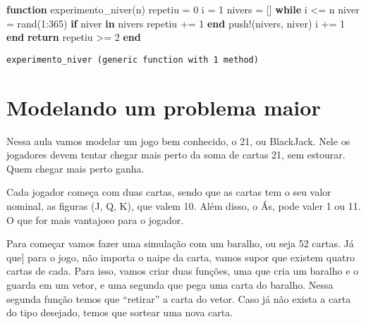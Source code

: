 \documentclass[
  letterpaper,
  DIV=11,
  numbers=noendperiod]{scrreprt}
\newenvironment{Shaded}{\begin{snugshade}}{\end{snugshade}}
\newcommand{\ControlFlowTok}[1]{\textcolor[rgb]{0.00,0.23,0.31}{\textbf{#1}}}
\newcommand{\FloatTok}[1]{\textcolor[rgb]{0.68,0.00,0.00}{#1}}
\newcommand{\FunctionTok}[1]{\textcolor[rgb]{0.28,0.35,0.67}{#1}}
\newcommand{\KeywordTok}[1]{\textcolor[rgb]{0.00,0.23,0.31}{\textbf{#1}}}
\newcommand{\NormalTok}[1]{\textcolor[rgb]{0.00,0.23,0.31}{#1}}
\newcommand{\OperatorTok}[1]{\textcolor[rgb]{0.37,0.37,0.37}{#1}}
\begin{document}
\begin{Shaded}
\begin{Highlighting}[]
\KeywordTok{function} \FunctionTok{experimento\_niver}\NormalTok{(n)}
\NormalTok{    repetiu }\OperatorTok{=} \FloatTok{0}
\NormalTok{    i }\OperatorTok{=} \FloatTok{1}
\NormalTok{    nivers }\OperatorTok{=}\NormalTok{ []}
    \ControlFlowTok{while}\NormalTok{ i }\OperatorTok{\textless{}=}\NormalTok{ n}
\NormalTok{        niver }\OperatorTok{=} \FunctionTok{rand}\NormalTok{(}\FloatTok{1}\OperatorTok{:}\FloatTok{365}\NormalTok{)}
        \ControlFlowTok{if}\NormalTok{ niver }\KeywordTok{in}\NormalTok{ nivers}
\NormalTok{            repetiu }\OperatorTok{+=} \FloatTok{1}
        \ControlFlowTok{end}
        \FunctionTok{push!}\NormalTok{(nivers, niver)}
\NormalTok{        i }\OperatorTok{+=} \FloatTok{1}
    \ControlFlowTok{end}
    \ControlFlowTok{return}\NormalTok{ repetiu }\OperatorTok{\textgreater{}=} \FloatTok{2}
\KeywordTok{end}
\end{Highlighting}
\end{Shaded}

\begin{verbatim}
experimento_niver (generic function with 1 method)
\end{verbatim}


\chapter{Modelando um problema maior}\label{modelando-um-problema-maior}

Nessa aula vamos modelar um jogo bem conhecido, o 21, ou BlackJack. Nele
os jogadores devem tentar chegar mais perto da soma de cartas 21, sem
estourar. Quem chegar mais perto ganha.

Cada jogador começa com duas cartas, sendo que as cartas tem o seu valor
nominal, as figuras (J, Q, K), que valem 10. Além disso, o Ás, pode
valer 1 ou 11. O que for mais vantajoso para o jogador.

Para começar vamos fazer uma simulação com um baralho, ou seja 52
cartas. Já que{]} para o jogo, não importa o naipe da carta, vamos supor
que existem quatro cartas de cada. Para isso, vamos criar duas funções,
uma que cria um baralho e o guarda em um vetor, e uma segunda que pega
uma carta do baralho. Nessa segunda função temos que ``retirar'' a carta
do vetor. Caso já não exista a carta do tipo desejado, temos que sortear
uma nova carta.
\end{document}
